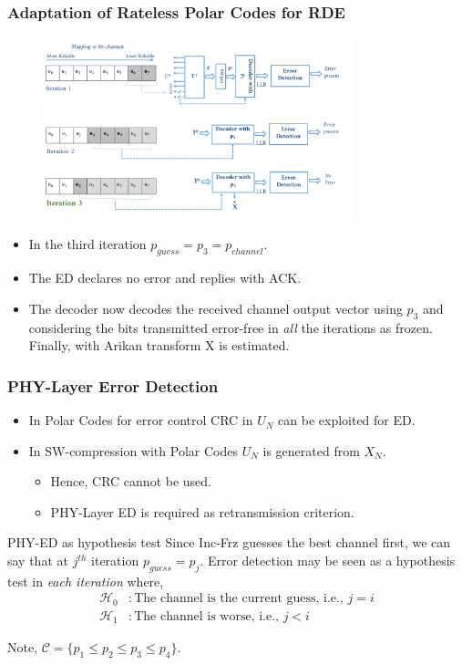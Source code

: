 \documentclass[xcolor=dvipsnames]{beamer}
\begin{document}
\begin{frame}[label=adapt3]
\frametitle{Adaptation of Rateless Polar Codes for RDE}
\begin{figure}[h]
 \begin{center}
    \includegraphics[width=9cm]{iswrpcp3.png}
  \end{center}
  \label{fig:iswrpc}
\end{figure}
\begin{itemize}
\item In the third iteration $p_{guess}=p_3=p_{channel}$.
\item The ED declares no error and replies with ACK. 
\item The decoder now  decodes the received channel output vector using $p_3$ and considering the bits transmitted error-free in \emph{all} the iterations as frozen. Finally, with Arikan transform X is estimated.
\end{itemize}
\end{frame}
\begin{frame}[label=phyed]
\frametitle{PHY-Layer Error Detection}
\begin{itemize}
\item In Polar Codes for error control CRC in $U_N$ can be exploited for ED.
\item In SW-compression with Polar Codes $U_N$ is generated from $X_N$.
\begin{itemize}
\item Hence, CRC cannot be used.
\item PHY-Layer ED is required as retransmission criterion.
\end{itemize}
\end{itemize}
\begin{block}{PHY-ED as hypothesis test}
Since Inc-Frz guesses the best channel first, we can say that at $j^{th}$ iteration $p_{guess}=p_j$. 
Error detection may be seen as a hypothesis test in \emph{each iteration} where,
\begin{align*}
\mathcal{H}_0 & :\text{The channel is the current guess, i.e., } j=i\\
\mathcal{H}_1 & :\text{The channel is worse, i.e., }j<i
\end{align*}
\vspace{0.1cm}
\end{block}
\vspace{0.5cm}
\tiny Note, $\mathcal{C}=\{ p_1 \leq p_2 \leq p_3 \leq p_4\}$.
\end{frame}
\end{document}
